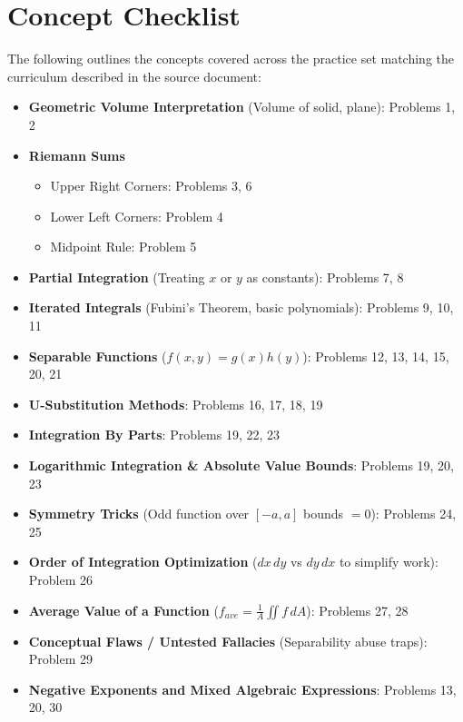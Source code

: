 \documentclass[11pt]{article}
\begin{document}
\newpage
\section*{Concept Checklist}
The following outlines the concepts covered across the practice set matching the curriculum described in the source document:

\begin{itemize}
    \item \textbf{Geometric Volume Interpretation} (Volume of solid, plane): Problems 1, 2
    \item \textbf{Riemann Sums}
    \begin{itemize}
        \item Upper Right Corners: Problems 3, 6
        \item Lower Left Corners: Problem 4
        \item Midpoint Rule: Problem 5
    \end{itemize}
    \item \textbf{Partial Integration} (Treating $x$ or $y$ as constants): Problems 7, 8
    \item \textbf{Iterated Integrals} (Fubini's Theorem, basic polynomials): Problems 9, 10, 11
    \item \textbf{Separable Functions} ($f(x,y) = g(x)h(y)$): Problems 12, 13, 14, 15, 20, 21
    \item \textbf{U-Substitution Methods}: Problems 16, 17, 18, 19
    \item \textbf{Integration By Parts}: Problems 19, 22, 23
    \item \textbf{Logarithmic Integration \& Absolute Value Bounds}: Problems 19, 20, 23
    \item \textbf{Symmetry Tricks} (Odd function over $[-a, a]$ bounds $= 0$): Problems 24, 25
    \item \textbf{Order of Integration Optimization} ($dx \, dy$ vs $dy \, dx$ to simplify work): Problem 26
    \item \textbf{Average Value of a Function} ($f_{ave} = \frac{1}{A} \iint f \, dA$): Problems 27, 28
    \item \textbf{Conceptual Flaws / Untested Fallacies} (Separability abuse traps): Problem 29
    \item \textbf{Negative Exponents and Mixed Algebraic Expressions}: Problems 13, 20, 30
\end{itemize}
\end{document}
